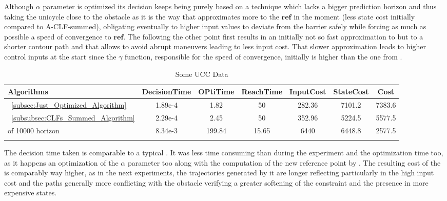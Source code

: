 Although  \(\alpha\) parameter is optimized its decision keeps being purely based on a  technique which lacks a bigger prediction horizon and thus taking the unicycle close to the obstacle as it is the way that approximates more to the \(\mathbf{ref}\) in the moment (less state cost initially compared to A-CLF-summed), obligating eventually to higher input values to deviate from the barrier safely while forcing as much as possible a speed of convergence to \(\mathbf{ref}\).  The  following the other point first results in an initially not so fast approximation to \txtref but to a shorter contour path and that allows to avoid abrupt maneuvers leading to less input cost. That slower approximation leads to higher control inputs at the start since the \(\gamma\) function, responsible for the speed of convergence, initially is higher than the one from . 

 \newpage %


  \bgroup
 \begin{xltabular}{\textwidth}{|l|cccccc|}
   \toprule
   Algorithms   & DecisionTime & OPtiTime & ReachTime  & InputCost   & StateCost & Cost           \\
   \midrule
    ~\ref{subsec:Just_Optimized_Algorithm}           & 1.89e-4 & 1.82 & 50 & 282.36 & 7101.2 & 7383.6 \\
    ~\ref{subsubsec:CLFs_Summed_Algorithm}        & 2.29e-4 & 2.45 & 50 & 352.96 & 5224.5 & 5577.5 \\
     of 10000 horizon                                 & 8.34e-3 & 199.84  & 15.65  & 6440  & 6448.8 & 2577.5 \\
    \midrule
    \caption{Some UCC Data}
    \label{tab:Some_UCC_Data}\\
   \end{xltabular}
 \egroup

The  decision time taken  is comparable to a typical . It was less time consuming than  during the experiment and the optimization time too, as it happens an optimization of the \(\alpha\) parameter too along with the computation of the new reference point by . The resulting cost of the  is comparably way higher, as in the next experiments, the trajectories generated by it are longer reflecting particularly in the high input cost and the paths generally more conflicting with the obstacle verifying a greater softening of the  constraint and the presence in more expensive states. \\


